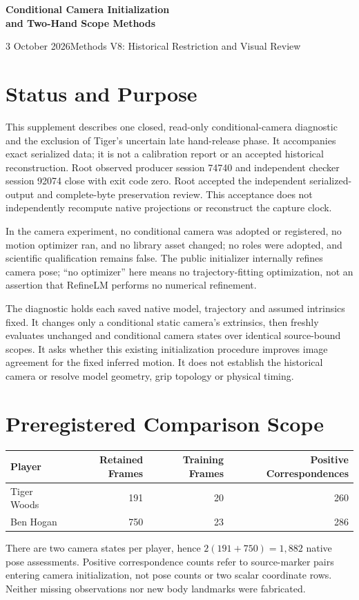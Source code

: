 \documentclass[11pt]{article}
\begin{document}
\begin{center}
{\LARGE\color{ink}\bfseries Conditional Camera Initialization\\and Two-Hand Scope Methods}\par
\vspace{8pt}{\large A Source-Bound Tiger Woods and Ben Hogan Supplement}\par
\vspace{8pt}3 October 2026\quad\textbullet\quad Methods V8: Historical Restriction and Visual Review
\end{center}
\section*{Status and Purpose}
This supplement describes one closed, read-only conditional-camera diagnostic and the exclusion of Tiger's uncertain late hand-release phase. It accompanies exact serialized data; it is not a calibration report or an accepted historical reconstruction. Root observed producer session 74740 and independent checker session 92074 close with exit code zero. Root accepted the independent serialized-output and complete-byte preservation review. This acceptance does not independently recompute native projections or reconstruct the capture clock.

In the camera experiment, no conditional camera was adopted or registered, no motion optimizer ran, and no library asset changed; no roles were adopted, and scientific qualification remains false. The public initializer internally refines camera pose; ``no optimizer'' here means no trajectory-fitting optimization, not an assertion that RefineLM performs no numerical refinement.

The diagnostic holds each saved native model, trajectory and assumed intrinsics fixed. It changes only a conditional static camera's extrinsics, then freshly evaluates unchanged and conditional camera states over identical source-bound scopes. It asks whether this existing initialization procedure improves image agreement for the fixed inferred motion. It does not establish the historical camera or resolve model geometry, grip topology or physical timing.
\section*{Preregistered Comparison Scope}
\begin{center}\begin{tabular}{lrrr}\toprule
Player & Retained Frames & Training Frames & Positive Correspondences\\\midrule
Tiger Woods & 191 & 20 & 260\\
Ben Hogan & 750 & 23 & 286\\\bottomrule
\end{tabular}\end{center}
There are two camera states per player, hence $2(191+750)=1,882$ native pose assessments. Positive correspondence counts refer to source-marker pairs entering camera initialization, not pose counts or two scalar coordinate rows. Neither missing observations nor new body landmarks were fabricated.
\end{document}
